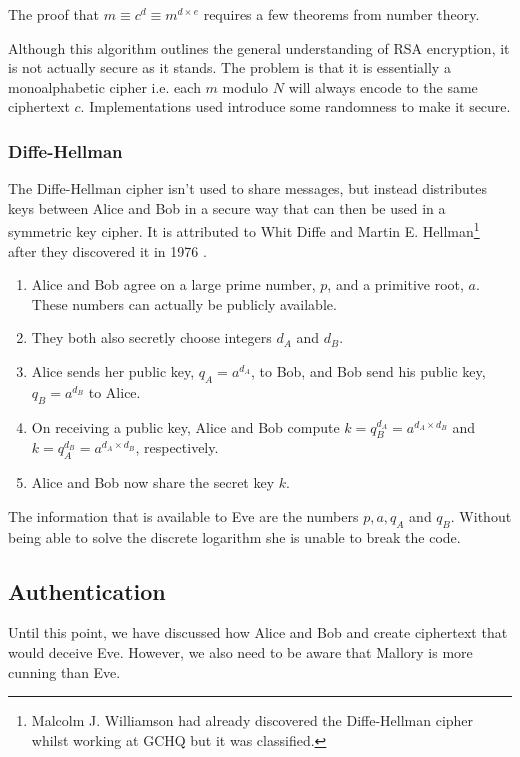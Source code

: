 The proof that $m \equiv c^d \equiv m^{d\times e}$ requires a few theorems from number theory. 

Although this algorithm outlines the general understanding of RSA encryption, it is not actually secure as it stands. The problem is that it is essentially a monoalphabetic cipher i.e. each $m$ modulo $N$ will always encode to the same ciphertext $c$. Implementations used introduce some randomness to make it secure.


\subsubsection*{Diffe-Hellman}

The Diffe-Hellman cipher isn't used to share messages, but instead distributes keys between Alice and Bob in a secure way that can then be used in a symmetric key cipher. It is attributed to Whit Diffe and Martin E. Hellman\footnote{Malcolm J. Williamson had already discovered the Diffe-Hellman cipher whilst working at GCHQ but it was classified.} after they discovered it in 1976 \cite{}.

\begin{enumerate}
	\item Alice and Bob agree on a large prime number, $p$, and a primitive root, $a$. These numbers can actually be publicly available.
	\item They both also secretly choose integers $d_A$ and $d_B$.
	\item Alice sends her public key, $q_A = a^{d_A}$, to Bob, and Bob send his public key, $q_B = a^{d_B}$ to Alice.
	\item On receiving a public key, Alice and Bob compute $k = q_B^{d_A} = a^{d_A\times d_B}$ and $k = q_A^{d_B} = a^{d_A\times d_B}$, respectively.
	\item Alice and Bob now share the secret key $k$.
\end{enumerate}

The information that is available to Eve are the numbers $p, a, q_{A}$ and $q_{B}$. Without being able to solve the discrete logarithm she is unable to break the code. 

\subsection{Authentication}

Until this point, we have discussed how Alice and Bob and create ciphertext that would deceive Eve. However, we also need to be aware that Mallory is more cunning than Eve. 

